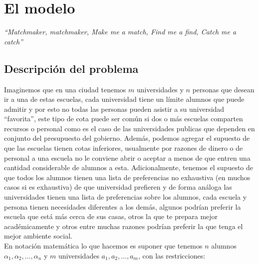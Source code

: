 \chapter{El modelo}
\begin{flushright}
\textit{``Matchmaker, matchmaker,
Make me a match, Find me a find,
Catch me a catch''}
\end{flushright}
\section{Descripción del problema}
Imaginemos que en una ciudad tenemos $m$ universidades y $n$ personas que desean ir a una de estas escuelas, cada universidad tiene un límite alumnos que puede admitir y por esto no todas las personas pueden asistir a su universidad
 ``favorita'', este tipo de cota puede ser común si dos o más escuelas comparten recursos o personal como es el caso de las universidades publicas que dependen en conjunto del presupuesto del gobierno. 
Además, podemos agregar el supuesto de que las escuelas tienen cotas inferiores, usualmente por razones de dinero o de personal a una escuela no le conviene abrir o aceptar a menos de que entren una cantidad considerable de alumnos a esta. Adicionalmente, tenemos el supuesto de que todos los alumnos tienen una lista de preferencias no exhaustiva (en muchos casos si es exhaustiva) de que universidad prefieren y de forma análoga las universidades tienen una lista de preferencias sobre los alumnos, cada escuela y persona tienen necesidades diferentes a los demás, algunos podrían preferir la escuela que está más cerca de sus casas, otros la que te prepara mejor académicamente y otros entre muchas razones podrían preferir la que tenga el mejor ambiente social. 
\\ En notación matemática lo que hacemos es suponer que tenemos $n$ alumnos $\alpha_1, \alpha_2, \ldots, \alpha_n$ y $m$ universidades $a_1, a_2, \ldots, a_m$, con las restricciones: 

